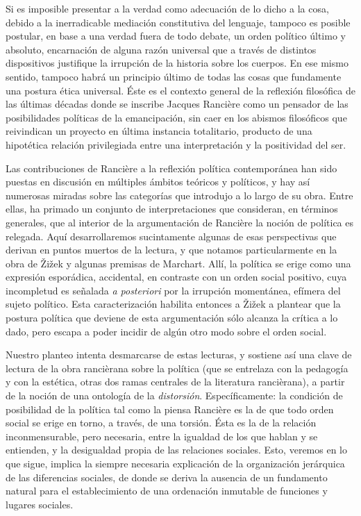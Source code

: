 Si es imposible presentar a la verdad como adecuación de lo dicho a la cosa, debido a la inerradicable mediación constitutiva del lenguaje, tampoco es posible postular, en base a una verdad fuera de todo debate, un orden político último y absoluto, encarnación de alguna razón universal que a través de distintos dispositivos justifique la irrupción de la historia sobre los cuerpos. En ese mismo sentido, tampoco habrá un principio último de todas las cosas que fundamente una postura ética universal. Éste es el contexto general de la reflexión filosófica de las últimas décadas donde se inscribe Jacques Rancière como un pensador de las posibilidades políticas de la emancipación, sin caer en los abismos filosóficos que reivindican un proyecto en última instancia totalitario, producto de una hipotética relación privilegiada entre una interpretación y la positividad del ser.

Las contribuciones de Rancière a la reflexión política contemporánea han sido puestas en discusión en múltiples ámbitos teóricos y políticos, y hay así numerosas miradas sobre las categorías que introdujo a lo largo de su obra. Entre ellas, ha primado un conjunto de interpretaciones que consideran, en términos generales, que al interior de la argumentación de Rancière la noción de política es relegada. Aquí desarrollaremos sucintamente algunas de esas perspectivas que derivan en puntos muertos de la lectura, y que notamos particularmente en la obra de Žižek y algunas premisas de Marchart. Allí, la política se erige como una expresión esporádica, accidental, en contraste con un orden social positivo, cuya incompletud es señalada \emph{a posteriori} por la irrupción momentánea, efímera del sujeto político. Esta caracterización habilita entonces a Žižek a plantear que la postura política que deviene de esta argumentación sólo alcanza la crítica a lo dado, pero escapa a poder incidir de algún otro modo sobre el orden social.

Nuestro planteo intenta desmarcarse de estas lecturas, y sostiene así una clave de lectura de la obra rancièrana sobre la política (que se entrelaza con la pedagogía y con la estética, otras dos ramas centrales de la literatura rancièrana), a partir de la noción de una ontología de la \emph{distorsión}. Específicamente: la condición de posibilidad de la política tal como la piensa Rancière es la de que todo orden social se erige en torno, a través, de una torsión. Ésta es la de la relación inconmensurable, pero necesaria, entre la igualdad de los que hablan y se entienden, y la desigualdad propia de las relaciones sociales. Esto, veremos en lo que sigue, implica la siempre necesaria explicación de la organización jerárquica de las diferencias sociales, de donde se deriva la ausencia de un fundamento natural para el establecimiento de una ordenación inmutable de funciones y lugares sociales.

